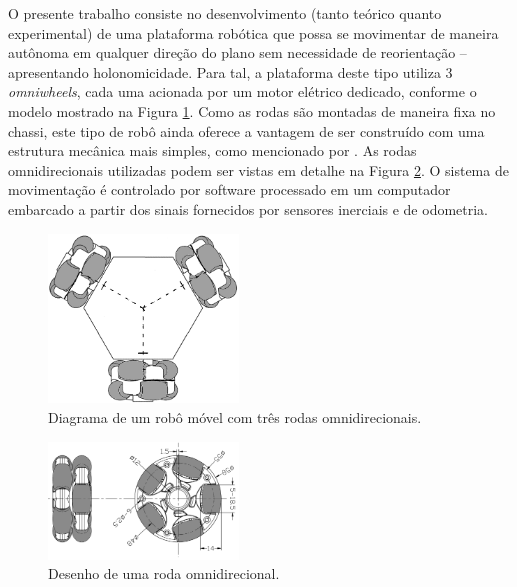 

O presente trabalho consiste no desenvolvimento (tanto teórico quanto experimental) de uma plataforma robótica que possa se movimentar de maneira autônoma em qualquer direção do plano sem necessidade de reorientação -- apresentando holonomicidade. Para tal, a plataforma deste tipo utiliza 3 \emph{omniwheels}, cada uma acionada por um motor elétrico dedicado, conforme o modelo mostrado na Figura \ref{fig:tomr_ritter}. Como as rodas são montadas de maneira fixa no chassi, este tipo de robô ainda oferece a vantagem de ser construído com uma estrutura mecânica mais simples, como mencionado por \cite{siciliano2016springer}. As rodas omnidirecionais utilizadas podem ser vistas em detalhe na Figura \ref{fig:omniwheel}. O sistema de movimentação é controlado por software processado em um computador embarcado a partir dos sinais fornecidos por sensores inerciais e de odometria.

\begin{figure}[h]
  \centering
  \includegraphics[width = 0.45\textwidth]{imagens/tomr_ritter_mod}
  \caption{Diagrama de um robô móvel com três rodas omnidirecionais.}
  \label{fig:tomr_ritter}
\end{figure}

\begin{figure}[h]
  \centering
  \includegraphics[width = 0.45\textwidth]{imagens/omniwheel}
  \caption{Desenho de uma roda omnidirecional.}
  \label{fig:omniwheel}
\end{figure}


